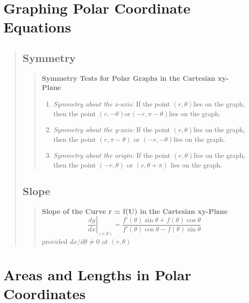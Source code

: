 \documentclass{report}
\begin{document}
\section{Graphing Polar Coordinate Equations }
\begin{quote}

	\subsection{Symmetry}
	\begin{quote}
		\textbf{Symmetry Tests for Polar Graphs in the Cartesian xy-Plane}\\
		\begin{enumerate}
			\item \textit{Symmetry about the x-axis:} If the point $(r,\theta)$lies on the graph, then the point $(r,-\theta)$or$(-r,\pi-\theta)$lies on the graph.
			\item \textit{Symmetry about the y-axis:} If the point $(r,\theta)$lies on the graph, then the point $(r,\pi -\theta)$ or $(-r,-\theta)$lies on the graph.
			\item \textit{Symmetry about the origin:} If the point $(r,\theta)$lies on the graph, then the point $(-r,\theta)$ or $(r, \theta +\pi)$ lies on the graph.
		\end{enumerate}
	\end{quote}

	\subsection{Slope}
	\begin{quote}

		\textbf{Slope of the Curve r = ƒ(U) in the Cartesian xy-Plane}
		$$\left. \frac{dy}{dx} \right |_{(r,\theta)} = \frac{f'(\theta)\sin \theta + f(\theta)\cos \theta}{f'(\theta)\cos \theta - f(\theta)\sin\theta}$$
		provided $dx/d\theta\neq 0$ at $(r,\theta)$

	\end{quote}

\end{quote}


\section{Areas and Lengths in Polar Coordinates  }
\begin{quote}

\end{quote}
\end{document}
